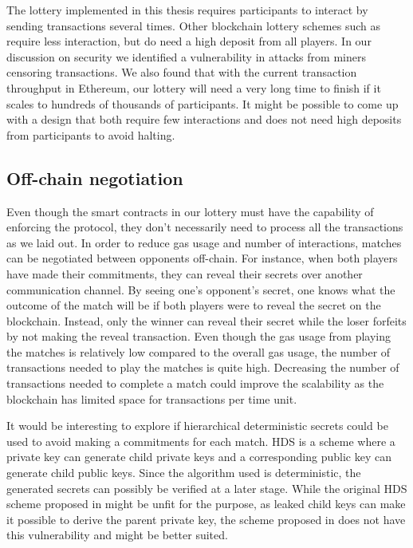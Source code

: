 The lottery implemented in this thesis requires participants to interact by sending transactions several times. Other blockchain lottery schemes such as~\cite{andrychowicz_secure_2014,bentov_how_2014} require less interaction, but do need a high deposit from all players. In our discussion on security we identified a vulnerability in attacks from miners censoring transactions. We also found that with the current transaction throughput in Ethereum, our lottery will need a very long time to finish if it scales to hundreds of thousands of participants. It might be possible to come up with a design that both require few interactions and does not need high deposits from participants to avoid halting.

\subsection{Off-chain negotiation}

Even though the smart contracts in our lottery must have the capability of enforcing the protocol, they don't necessarily need to process all the transactions as we laid out. In order to reduce gas usage and number of interactions, matches can be negotiated between opponents off-chain. For instance, when both players have made their commitments, they can reveal their secrets over another communication channel. By seeing one's opponent's secret, one knows what the outcome of the match will be if both players were to reveal the secret on the blockchain. Instead, only the winner can reveal their secret while the loser forfeits by not making the reveal transaction. Even though the gas usage from playing the matches is relatively low compared to the overall gas usage, the number of transactions needed to play the matches is quite high. Decreasing the number of transactions needed to complete a match could improve the scalability as the blockchain has limited space for transactions per time unit.

It would be interesting to explore if hierarchical deterministic secrets could be used to avoid making a commitments for each match. HDS is a scheme where a private key can generate child private keys and a corresponding public key can generate child public keys. Since the algorithm used is deterministic, the generated secrets can possibly be verified at a later stage. While the original HDS scheme proposed in \cite{wuille_bitcoin_2012} might be unfit for the purpose, as leaked child keys can make it possible to derive the parent private key, the scheme proposed in \cite{gutoski_hierarchical_2015} does not have this vulnerability and might be better suited.

